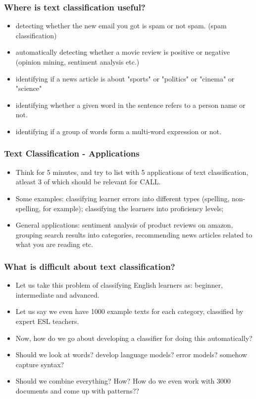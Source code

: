 \documentclass{beamer}
\begin{document}
\begin{frame}
\frametitle{Where is text classification useful?}
\begin{itemize}
\item detecting whether the new email you got is spam or not spam. (spam classification)
\item automatically detecting whether a movie review is positive or negative (opinion mining, sentiment analysis etc.)
\item identifying if a news article is about "sports" or "politics" or "cinema" or "science"
\item identifying whether a given word in the sentence refers to a person name or not.
\item identifying if a group of words form a multi-word expression or not.
\end{itemize}
\end{frame}

\begin{frame}
\frametitle{Text Classification - Applications}
\begin{itemize}
\item Think for 5 minutes, and try to list with 5 applications of text classification, atleast 3 of which should be relevant for CALL. \pause
\item Some examples: classifying learner errors into different types (spelling, non-spelling, for example); classifying the learners into proficiency levels;
\item General applications: sentiment analysis of product reviews on amazon, grouping search results into categories, recommending news articles related to what you are reading etc.
\end{itemize}
\end{frame}

\begin{frame}
\frametitle{What is difficult about text classification?}
\begin{itemize}
\item Let us take this problem of classifying English learners as: beginner, intermediate and advanced.
\item Let us say we even have 1000 example texts for each category, classified by expert ESL teachers. 
\item Now, how do we go about developing a classifier for doing this automatically? \pause
\item Should we look at words? develop language models? error models? somehow capture syntax? \pause
\item Should we combine everything? How? How do we even work with 3000 documents and come up with patterns?? 
\end{itemize}
\end{frame}
\end{document}
